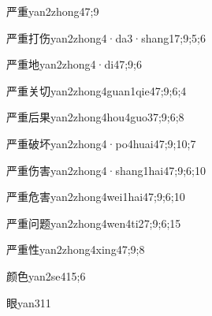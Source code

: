 \begin{verbete}{严重}{yan2zhong4}{7;9}
\end{verbete}

\begin{verbete}{严重打伤}{yan2zhong4·da3·shang1}{7;9;5;6}
\end{verbete}

\begin{verbete}{严重地}{yan2zhong4·di4}{7;9;6}
\end{verbete}

\begin{verbete}{严重关切}{yan2zhong4guan1qie4}{7;9;6;4}
\end{verbete}

\begin{verbete}{严重后果}{yan2zhong4hou4guo3}{7;9;6;8}
\end{verbete}

\begin{verbete}{严重破坏}{yan2zhong4·po4huai4}{7;9;10;7}
\end{verbete}

\begin{verbete}{严重伤害}{yan2zhong4·shang1hai4}{7;9;6;10}
\end{verbete}

\begin{verbete}{严重危害}{yan2zhong4wei1hai4}{7;9;6;10}
\end{verbete}

\begin{verbete}{严重问题}{yan2zhong4wen4ti2}{7;9;6;15}
\end{verbete}

\begin{verbete}{严重性}{yan2zhong4xing4}{7;9;8}
\end{verbete}

\begin{verbete}{颜色}{yan2se4}{15;6}
\end{verbete}

\begin{verbete}{眼}{yan3}{11}
\end{verbete}

